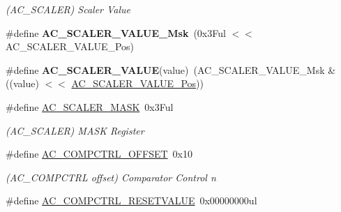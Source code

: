 \begin{DoxyCompactItemize}
\begin{DoxyCompactList}\small\item\em (A\+C\+\_\+\+S\+C\+A\+L\+E\+R) Scaler Value \end{DoxyCompactList}\item 
\hypertarget{group___s_a_m_l21___a_c_gaeb4641818905987a3e1f36fd5c2a5150}{}\#define {\bfseries A\+C\+\_\+\+S\+C\+A\+L\+E\+R\+\_\+\+V\+A\+L\+U\+E\+\_\+\+Msk}~(0x3\+Ful $<$$<$ A\+C\+\_\+\+S\+C\+A\+L\+E\+R\+\_\+\+V\+A\+L\+U\+E\+\_\+\+Pos)\label{group___s_a_m_l21___a_c_gaeb4641818905987a3e1f36fd5c2a5150}

\item 
\hypertarget{group___s_a_m_l21___a_c_ga2a0f030bdb051afbacf88a3fc5e9993a}{}\#define {\bfseries A\+C\+\_\+\+S\+C\+A\+L\+E\+R\+\_\+\+V\+A\+L\+U\+E}(value)~(A\+C\+\_\+\+S\+C\+A\+L\+E\+R\+\_\+\+V\+A\+L\+U\+E\+\_\+\+Msk \& ((value) $<$$<$ \hyperlink{group___s_a_m_l21___a_c_ga1afb18c8a62012c570ed01f711dac8f4}{A\+C\+\_\+\+S\+C\+A\+L\+E\+R\+\_\+\+V\+A\+L\+U\+E\+\_\+\+Pos}))\label{group___s_a_m_l21___a_c_ga2a0f030bdb051afbacf88a3fc5e9993a}

\item 
\hypertarget{group___s_a_m_l21___a_c_gaf91bd55c59e267338586cba14d252c31}{}\#define \hyperlink{group___s_a_m_l21___a_c_gaf91bd55c59e267338586cba14d252c31}{A\+C\+\_\+\+S\+C\+A\+L\+E\+R\+\_\+\+M\+A\+S\+K}~0x3\+Ful\label{group___s_a_m_l21___a_c_gaf91bd55c59e267338586cba14d252c31}

\begin{DoxyCompactList}\small\item\em (A\+C\+\_\+\+S\+C\+A\+L\+E\+R) M\+A\+S\+K Register \end{DoxyCompactList}\item 
\hypertarget{group___s_a_m_l21___a_c_ga9adbf00895d91af14908e942640e2e2d}{}\#define \hyperlink{group___s_a_m_l21___a_c_ga9adbf00895d91af14908e942640e2e2d}{A\+C\+\_\+\+C\+O\+M\+P\+C\+T\+R\+L\+\_\+\+O\+F\+F\+S\+E\+T}~0x10\label{group___s_a_m_l21___a_c_ga9adbf00895d91af14908e942640e2e2d}

\begin{DoxyCompactList}\small\item\em (A\+C\+\_\+\+C\+O\+M\+P\+C\+T\+R\+L offset) Comparator Control n \end{DoxyCompactList}\item 
\hypertarget{group___s_a_m_l21___a_c_ga7aff9c3d55f6002d210eacea4f433a40}{}\#define \hyperlink{group___s_a_m_l21___a_c_ga7aff9c3d55f6002d210eacea4f433a40}{A\+C\+\_\+\+C\+O\+M\+P\+C\+T\+R\+L\+\_\+\+R\+E\+S\+E\+T\+V\+A\+L\+U\+E}~0x00000000ul\label{group___s_a_m_l21___a_c_ga7aff9c3d55f6002d210eacea4f433a40}


\end{DoxyCompactItemize}
